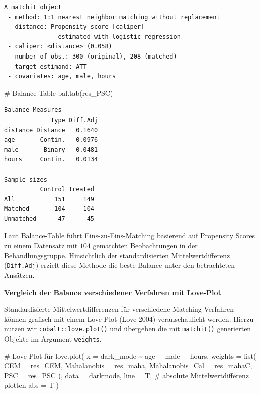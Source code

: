 \documentclass[
  a4paper,
  DIV=11,
  oneside]{scrreprt}
\newenvironment{Shaded}{\begin{snugshade}}{\end{snugshade}}
\newcommand{\AttributeTok}[1]{\textcolor[rgb]{0.40,0.45,0.13}{#1}}
\newcommand{\CommentTok}[1]{\textcolor[rgb]{0.37,0.37,0.37}{#1}}
\newcommand{\FunctionTok}[1]{\textcolor[rgb]{0.28,0.35,0.67}{#1}}
\newcommand{\NormalTok}[1]{\textcolor[rgb]{0.00,0.23,0.31}{#1}}
\newcommand{\SpecialCharTok}[1]{\textcolor[rgb]{0.37,0.37,0.37}{#1}}
\begin{document}
\begin{verbatim}
A matchit object
 - method: 1:1 nearest neighbor matching without replacement
 - distance: Propensity score [caliper]
             - estimated with logistic regression
 - caliper: <distance> (0.058)
 - number of obs.: 300 (original), 208 (matched)
 - target estimand: ATT
 - covariates: age, male, hours
\end{verbatim}

\begin{Shaded}
\begin{Highlighting}[]
\CommentTok{\# Balance Table}
\FunctionTok{bal.tab}\NormalTok{(res\_PSC)}
\end{Highlighting}
\end{Shaded}

\begin{verbatim}
Balance Measures
             Type Diff.Adj
distance Distance   0.1640
age       Contin.  -0.0976
male       Binary   0.0481
hours     Contin.   0.0134

Sample sizes
          Control Treated
All           151     149
Matched       104     104
Unmatched      47      45
\end{verbatim}

Laut Balance-Table führt Eins-zu-Eins-Matching basierend auf Propensity
Scores zu einem Datensatz mit \(104\) gematchten Beobachtungen in der
Behandlungsgruppe. Hinsichtlich der standardisierten Mittelwertdifferenz
(\texttt{Diff.Adj}) erzielt diese Methode die beste Balance unter den
betrachteten Ansätzen.

\textbf{Vergleich der Balance verschiedener Verfahren mit Love-Plot}

Standardisierte Mittelwertdifferenzen für verschiedene
Matching-Verfahren können grafisch mit einem Love-Plot (Love 2004)
veranschaulicht werden. Hierzu nutzen wir \texttt{cobalt::love.plot()}
und übergeben die mit \texttt{matchit()} generierten Objekte im Argument
\texttt{weights}.

\begin{Shaded}
\begin{Highlighting}[]
\CommentTok{\# Love{-}Plot für}
\FunctionTok{love.plot}\NormalTok{(}
  \AttributeTok{x =}\NormalTok{ dark\_mode }\SpecialCharTok{\textasciitilde{}}\NormalTok{ age }\SpecialCharTok{+}\NormalTok{ male }\SpecialCharTok{+}\NormalTok{ hours, }
  \AttributeTok{weights =} \FunctionTok{list}\NormalTok{(}
    \AttributeTok{CEM =}\NormalTok{ res\_CEM,}
    \AttributeTok{Mahalanobis =}\NormalTok{ res\_maha,}
    \AttributeTok{Mahalanobis\_Cal =}\NormalTok{ res\_mahaC,}
    \AttributeTok{PSC =}\NormalTok{ res\_PSC}
\NormalTok{  ),}
  \AttributeTok{data =}\NormalTok{ darkmode, }
  \AttributeTok{line =}\NormalTok{ T,}
  \CommentTok{\# absolute Mittelwertdifferenz plotten}
  \AttributeTok{abs =}\NormalTok{ T}
\NormalTok{)}
\end{Highlighting}
\end{Shaded}
\end{document}
